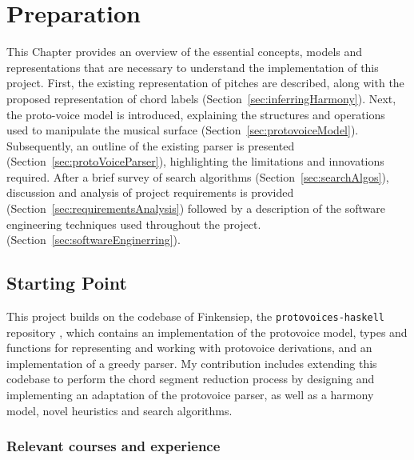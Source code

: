 \documentclass[12pt,a4paper,twoside,openany]{report} \usepackage[pdfborder={0 0 0}]{hyperref}    %
\theoremstyle{definition} \newtheorem{definition}{Definition}[section]
\begin{document}
    \chapter{Preparation}%
    This Chapter provides an overview of the essential concepts, models and representations that are necessary to understand the implementation of this project.
    First, the existing representation of pitches are described, along with the proposed representation of chord labels (Section~\ref{sec:inferringHarmony}).
    Next, the proto-voice model is introduced, explaining the structures and operations used to manipulate the musical surface (Section~\ref{sec:protovoiceModel}). 
    Subsequently, an outline of the existing parser is presented (Section~\ref{sec:protoVoiceParser}), highlighting the limitations and innovations required. 
    After a brief survey of search algorithms (Section~\ref{sec:searchAlgos}), discussion and analysis of project requirements is provided
    (Section~\ref{sec:requirementsAnalysis}) followed by a description of the software engineering techniques used
    throughout the project. (Section~\ref{sec:softwareEnginerring}).

\section{Starting Point}
\label{sec:startingPoint}


This project builds on the codebase of Finkensiep, the \texttt{protovoices-haskell}
repository \cite{finkensiepProtovoicesModelTonal2021}, which contains an implementation 
of the protovoice model, types and functions for representing and working with protovoice derivations, and an
implementation of a greedy parser. 
My contribution includes extending this codebase to perform the chord segment reduction process by designing and
implementing an adaptation of the protovoice parser, as well as a harmony model, novel heuristics and search algorithms.  


\subsection{Relevant courses and experience}
\label{sub:coursesExperience}
\end{document}
